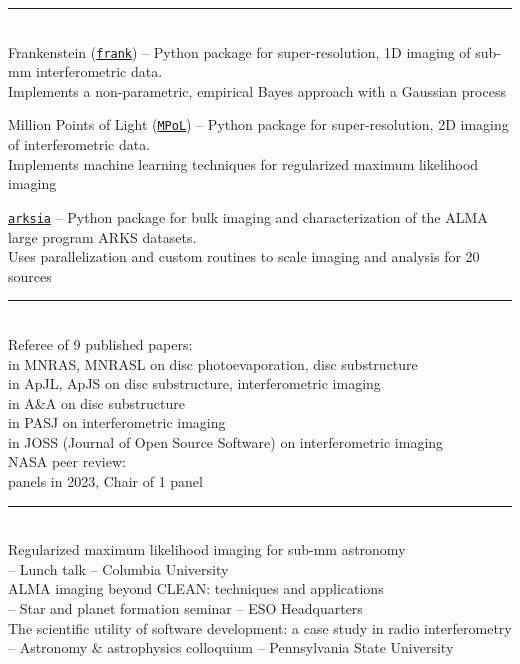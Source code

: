 \documentclass[10pt,preprint]{aastex}
\newcommand*{\xdash}[1][3em]{\rule[0.5ex]{#1}{0.7pt}}
\begin{document}
 \xdash[98.5ex] \\
\noindent Frankenstein (\href{https://discsim.github.io/frank/}{\tt frank}) -- Python package for super-resolution, 1D imaging of sub-mm interferometric data. \\ \-\hspace{3.65cm}Implements a non-parametric, empirical Bayes approach with a Gaussian process

\noindent Million Points of Light (\href{https://mpol-dev.github.io/MPoL/index.html}{\tt MPoL}) -- Python package for super-resolution, 2D imaging of interferometric data. \\ \-\hspace{3.65cm}Implements machine learning techniques for regularized maximum likelihood imaging

\noindent \href{https://github.com/jeffjennings/arksia/}{\tt arksia} -- Python package for bulk imaging and characterization of the ALMA large program ARKS datasets. \\ \-\hspace{3.65cm}Uses parallelization and custom routines to scale imaging and analysis for 20 sources

 \xdash[95ex] \\
\noindent Referee of 9 published papers: \\
 in MNRAS, MNRASL on disc photoevaporation, disc substructure \\
 in ApJL, ApJS on disc substructure, interferometric imaging \\
 in A\&A on disc substructure \\
 in PASJ on interferometric imaging \\
 in JOSS (Journal of Open Source Software) on interferometric imaging \\
\noindent NASA peer review: \\
 panels in 2023, Chair of 1 panel

 \xdash[94ex] \\
\noindent Regularized maximum likelihood imaging for sub-mm astronomy \\
 -- Lunch talk -- Columbia University \\
\noindent ALMA imaging beyond CLEAN: techniques and applications \\
 -- Star and planet formation seminar -- ESO Headquarters \\
\noindent The scientific utility of software development: a case study in radio interferometry \\
 -- Astronomy \& astrophysics colloquium -- Pennsylvania State University
\end{document}
